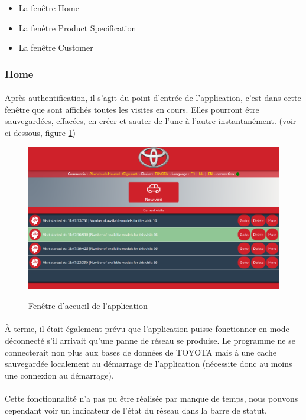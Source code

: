 \documentclass[12pt]{report}
\begin{document}
\begin{itemize}
\item La fenêtre Home
\item La fenêtre Product Specification
\item La fenêtre Customer
\end{itemize}

\subsubsection*{Home}
\paragraph{}
Après authentification, il s'agit du point d'entrée de l'application, c'est dans cette fenêtre que sont affichés toutes les visites en cours. Elles pourront être sauvegardées, effacées, en créer et sauter de l'une à l'autre instantanément.
(voir ci-dessous, figure \ref{image_home})

\begin{figure}[H]
	\caption{Fenêtre d'accueil de l'application}
	\includegraphics[width=\linewidth]{img/image_home}
	\label{image_home}
\end{figure}

\paragraph{}
À terme, il était également prévu que l'application puisse fonctionner en mode déconnecté s'il arrivait qu'une panne de réseau se produise. Le programme ne se connecterait non plus aux bases de données de TOYOTA mais à une cache sauvegardée localement au démarrage de l'application (nécessite donc au moins une connexion au démarrage).
\paragraph{}
Cette fonctionnalité n'a pas pu être réalisée par manque de temps, nous pouvons cependant voir un indicateur de l'état du réseau dans la barre de statut.
\end{document}
